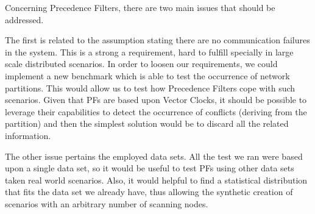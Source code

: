Concerning Precedence Filters, there are two main issues that should be
addressed.

The first is related to the assumption stating there are
no communication failures in the system. This is a strong a requirement,
hard to fulfill specially in large scale distributed scenarios.  In
order to loosen our requirements, we could implement a new benchmark which is
able to test the occurrence of network partitions.  This would allow
us to test how Precedence Filters cope with such scenarios. Given that
PFs are based upon Vector Clocks, it should be possible to leverage
their capabilities to detect the occurrence of conflicts (deriving
from the partition) and then the simplest solution would be to discard
all the related information.

The other issue pertains the employed data sets. All the test we ran were
based upon a single data set, so it would be useful to test PFs using
other data sets taken real world scenarios. Also, it would helpful to
find a statistical distribution that fits the data set we already
have, thus allowing the synthetic creation of scenarios with an
arbitrary number of scanning nodes.


